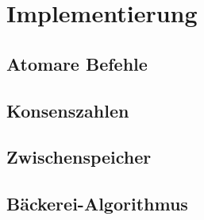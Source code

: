 \chapter{Implementierung}

\section{Atomare Befehle}

\section{Konsenszahlen}

\section{Zwischenspeicher}

\section{Bäckerei-Algorithmus}